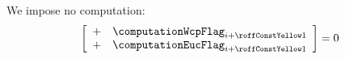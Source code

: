 We impose no computation:
\[
	\left[ \begin{array}{cl}
		+ & \computationWcpFlag _{i + \sysiNoopComputationRowOffset} \\
		+ & \computationEucFlag _{i + \sysiNoopComputationRowOffset} \\
	\end{array} \right]
	= 0
\]
